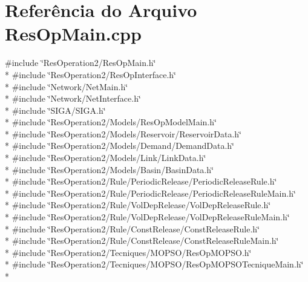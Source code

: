 \section{Referência do Arquivo Res\+Op\+Main.\+cpp}
\label{_2_res_op_main_8cpp}
{\ttfamily \#include \char`\"{}Res\+Operation2/\+Res\+Op\+Main.\+h\char`\"{}}\\*
{\ttfamily \#include \char`\"{}Res\+Operation2/\+Res\+Op\+Interface.\+h\char`\"{}}\\*
{\ttfamily \#include \char`\"{}Network/\+Net\+Main.\+h\char`\"{}}\\*
{\ttfamily \#include \char`\"{}Network/\+Net\+Interface.\+h\char`\"{}}\\*
{\ttfamily \#include \char`\"{}S\+I\+G\+A/\+S\+I\+G\+A.\+h\char`\"{}}\\*
{\ttfamily \#include \char`\"{}Res\+Operation2/\+Models/\+Res\+Op\+Model\+Main.\+h\char`\"{}}\\*
{\ttfamily \#include \char`\"{}Res\+Operation2/\+Models/\+Reservoir/\+Reservoir\+Data.\+h\char`\"{}}\\*
{\ttfamily \#include \char`\"{}Res\+Operation2/\+Models/\+Demand/\+Demand\+Data.\+h\char`\"{}}\\*
{\ttfamily \#include \char`\"{}Res\+Operation2/\+Models/\+Link/\+Link\+Data.\+h\char`\"{}}\\*
{\ttfamily \#include \char`\"{}Res\+Operation2/\+Models/\+Basin/\+Basin\+Data.\+h\char`\"{}}\\*
{\ttfamily \#include \char`\"{}Res\+Operation2/\+Rule/\+Periodic\+Release/\+Periodic\+Release\+Rule.\+h\char`\"{}}\\*
{\ttfamily \#include \char`\"{}Res\+Operation2/\+Rule/\+Periodic\+Release/\+Periodic\+Release\+Rule\+Main.\+h\char`\"{}}\\*
{\ttfamily \#include \char`\"{}Res\+Operation2/\+Rule/\+Vol\+Dep\+Release/\+Vol\+Dep\+Release\+Rule.\+h\char`\"{}}\\*
{\ttfamily \#include \char`\"{}Res\+Operation2/\+Rule/\+Vol\+Dep\+Release/\+Vol\+Dep\+Release\+Rule\+Main.\+h\char`\"{}}\\*
{\ttfamily \#include \char`\"{}Res\+Operation2/\+Rule/\+Const\+Release/\+Const\+Release\+Rule.\+h\char`\"{}}\\*
{\ttfamily \#include \char`\"{}Res\+Operation2/\+Rule/\+Const\+Release/\+Const\+Release\+Rule\+Main.\+h\char`\"{}}\\*
{\ttfamily \#include \char`\"{}Res\+Operation2/\+Tecniques/\+M\+O\+P\+S\+O/\+Res\+Op\+M\+O\+P\+S\+O.\+h\char`\"{}}\\*
{\ttfamily \#include \char`\"{}Res\+Operation2/\+Tecniques/\+M\+O\+P\+S\+O/\+Res\+Op\+M\+O\+P\+S\+O\+Tecnique\+Main.\+h\char`\"{}}\\*
